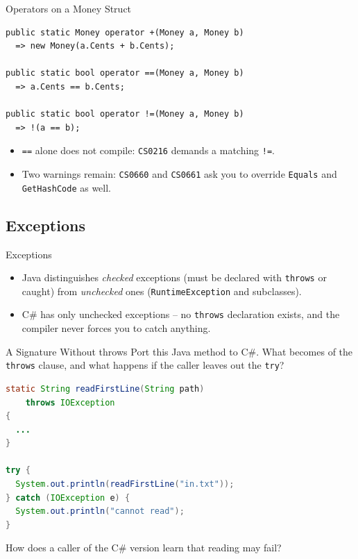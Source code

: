 \begin{solutionframe}{Operators on a Money Struct}
  \begin{lstlisting}[basicstyle=\scriptsize\ttfamily]
public static Money operator +(Money a, Money b)
  => new Money(a.Cents + b.Cents);

public static bool operator ==(Money a, Money b)
  => a.Cents == b.Cents;

public static bool operator !=(Money a, Money b)
  => !(a == b);
  \end{lstlisting}
  \begin{itemize}
    \item \texttt{==} alone does not compile: \texttt{CS0216} demands a matching
      \texttt{!=}.
    \item Two warnings remain: \texttt{CS0660} and \texttt{CS0661} ask you to
      override \texttt{Equals} and \texttt{GetHashCode} as well.
  \end{itemize}
  \vspace{3ex}

\end{solutionframe}

\subsection{Exceptions}

\begin{frame}{Exceptions}
  \begin{itemize}
    \item Java distinguishes \emph{checked} exceptions (must be declared
      with \texttt{throws} or caught) from \emph{unchecked} ones
      (\texttt{RuntimeException} and subclasses).
    \item C\# has only unchecked exceptions -- no \texttt{throws}
      declaration exists, and the compiler never forces you to catch
      anything.
  \end{itemize}
\end{frame}

\begin{exerciseframe}{A Signature Without throws}
  Port this Java method to C\#. What becomes of the \texttt{throws} clause, and what
  happens if the caller leaves out the \texttt{try}?
  \vspace{1ex}

  \begin{lstlisting}[language=Java,basicstyle=\scriptsize\ttfamily]
static String readFirstLine(String path)
    throws IOException
{
  ...
}

try {
  System.out.println(readFirstLine("in.txt"));
} catch (IOException e) {
  System.out.println("cannot read");
}
  \end{lstlisting}
  \vspace{1ex}

  How does a caller of the C\# version learn that reading may fail?
\end{exerciseframe}

